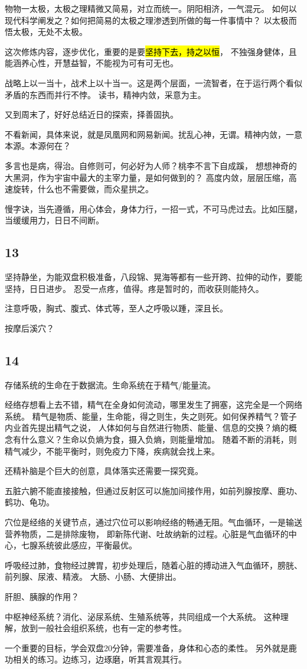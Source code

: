 物物一太极，太极之理精微又简易，对立而统一。阴阳相济，一气混元。
如何以现代科学阐发之？如何把简易的太极之理渗透到所做的每一件事情中？
以太极而悟太极，无处不太极。

这次修炼内容，逐步优化，重要的是要\hl{坚持下去，持之以恒}，
不独强身健体，且能涵养心性，开慧益智，不能视为可有可无也。

战略上以一当十，战术上以十当一。这是两个层面，一流智者，在于运行两个看似矛盾的东西而并行不悖。
读书，精神内敛，采意为主。

又到周末了，好好总结近日的探索，择善固执。

不看新闻，具体来说，就是凤凰网和网易新闻。扰乱心神，无谓。精神内敛，一意本源。本源何在？

多言也是病，得治。自修则可，何必好为人师？桃李不言下自成蹊，
想想神奇的大黑洞，作为宇宙中最大的主宰力量，是如何做到的？
高度内敛，层层压缩，高速旋转，什么也不需要做，而众星拱之。

慢字诀，当先遵循，用心体会，身体力行，一招一式，不可马虎过去。比如压腿，当缓缓用力，日日不间断。

\subsection{13}

坚持静坐，为能双盘积极准备，八段锦、晃海等都有一些开跨、拉伸的动作，要能坚持，日日进步。
忍受一点疼，值得。疼是暂时的，而收获则能持久。

注意呼吸，胸式、腹式、体式等，至人之呼吸以踵，深且长。

按摩后溪穴？

\subsection{14}

存储系统的生命在于数据流。生命系统在于精气/能量流。

经络存想看上去不错，精气在全身如何流动，哪里发生了拥塞，这完全是一个网络系统。
精气是物质、能量，生命能，得之则生，失之则死。如何保养精气？管子内业首先提出精气之说，
人体如何与自然进行物质、能量、信息的交换？熵的概念有什么意义？生命以负熵为食，摄入负熵，则能量增加。
随着不断的消耗，则精气减少，不能平衡时，则免疫力下降，疾病就会找上来。

还精补脑是个巨大的创意，具体落实还需要一探究竟。

五脏六腑不能直接接触，但通过反射区可以施加间接作用，如前列腺按摩、鹿功、鹤功、龟功。

穴位是经络的关键节点，通过穴位可以影响经络的畅通无阻。气血循环，一是输送营养物质，二是排除废物，
即新陈代谢、吐故纳新的过程。心脏是气血循环的中心，七腺系统彼此感应，平衡最优。

呼吸经过肺，食物经过脾胃，初步处理后，随着心脏的搏动进入气血循环，膀胱、前列腺、尿液、精液。
大肠、小肠、大便排出。

肝胆、胰腺的作用？

中枢神经系统？消化、泌尿系统、生殖系统等，共同组成一个大系统。
这种理解，放到一般社会组织系统，也有一定的参考性。

一个重要的目标，学会双盘20分钟，需要准备，身体和心态的柔性。
另外就是鹿功相关的练习。边练习，边琢磨，听其言观其行。
